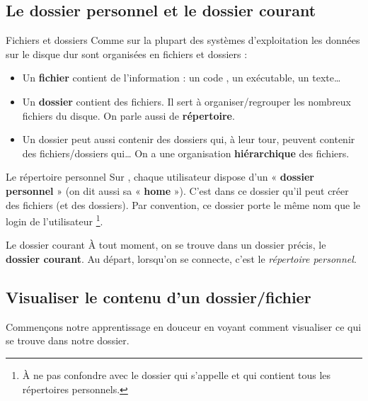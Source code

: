 \documentclass[a4paper,11pt]{style-esi/td}
\begin{document}
	\subsection{Le dossier personnel et le dossier courant}

		\begin{theorie}{Fichiers et dossiers}
			Comme sur la plupart des systèmes d'exploitation 
			les données sur le disque dur 
			sont organisées en fichiers et dossiers :
			\begin{itemize}
			\item 
				Un \textbf{fichier} contient de l'information : 
				un code , un exécutable, un texte\dots{}
			\item 
				Un \textbf{dossier} contient des fichiers. 
				Il sert à organiser/regrouper les nombreux fichiers du disque. 
				On parle aussi de \textbf{répertoire}.
			\item 
				Un dossier peut aussi contenir des dossiers qui, à leur tour, 
				peuvent contenir des fichiers/dossiers qui\dots{}
				On a une organisation \textbf{hiérarchique} des fichiers.
			\end{itemize}
		\end{theorie}

		\begin{theorie}{Le répertoire personnel}
			Sur , chaque utilisateur dispose d'un « \textbf{dossier personnel} » 
			(on dit aussi sa « \textbf{home} »). 
			C'est dans ce dossier qu'il peut créer des fichiers (et des dossiers). 
			Par convention, ce dossier porte le même nom que le login de l'utilisateur%
			\footnote{%
				À ne pas confondre avec le dossier qui s'appelle 
				et qui contient tous les répertoires personnels.
			}.
		\end{theorie}

		\begin{theorie}{Le dossier courant}
			À tout moment,
			on se trouve dans un dossier précis, le \og{}\textbf{dossier courant}\fg{}. 
			Au départ, lorsqu'on se connecte, c’est le \emph{répertoire personnel}.
		\end{theorie}

	\subsection{Visualiser le contenu d'un dossier/fichier}

		Commençons notre apprentissage en douceur
		en voyant comment visualiser ce qui se trouve dans notre dossier.
\end{document}
